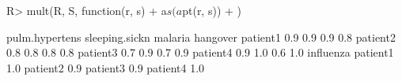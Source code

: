 \begin{Schunk}
% --begin: "comp.mult"
\begin{Sinput}
R> mult(R, S, function(r, s) {
+      a$s(a$pt(r, s))
+  })
\end{Sinput}
\begin{Soutput}
         pulm.hypertens sleeping.sickn malaria hangover
patient1            0.9            0.9     0.9      0.8
patient2            0.8            0.8     0.8      0.8
patient3            0.7            0.9     0.7      0.9
patient4            0.9            1.0     0.6      1.0
         influenza
patient1       1.0
patient2       0.9
patient3       0.9
patient4       1.0
\end{Soutput}
%
% --end: "comp.mult"
\end{Schunk}
